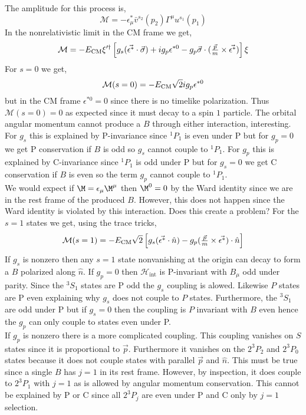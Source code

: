 \documentclass[12pt]{article}
\newcommand{\cM}{\mathcal{M}}
\begin{document}
The amplitude for this process is,
\[ \cM = - \epsilon_\mu^* \bar{v}^{s_2}(p_2) \Gamma^\mu u^{s_1}(p_1) \]
In the nonrelativistic limit in the CM frame we get,
\[ \cM = - E_{\CM} \xi'^{\dagger} \left[ g_s ( \vec{\epsilon^*} \cdot \vec{\sigma}) + i g_p \epsilon^{*0} - g_p \vec{\sigma} \cdot (\tfrac{\vec{p}}{m} \times \vec{\epsilon^*})  \right] \xi \]
For $s = 0$ we get,
\[ \cM(s = 0) = - E_{\CM} \sqrt{2} i g_p \epsilon^{*0} \]
but in the CM frame $\epsilon^{*0} = 0$ since there is no timelike polarization. Thus $\cM(s = 0) = 0$ as expected since it must decay to a spin $1$ particle. The orbital angular momentum cannot produce a $B$ through either interaction, interesting. For $g_s$ this is explained by P-invariance since ${}^1 P_1$ is even under P but for $g_p = 0$ we get P conservation if $B$ is odd so $g_s$ cannot couple to ${}^1 P_1$. For $g_p$ this is explained by C-invariance since ${}^1 P_1$ is odd under P but for $g_s = 0$ we get C conservation if $B$ is even so the term $g_p$ cannot couple to ${}^1 P_1$.
\bigskip\\
We would expect if $\M = \epsilon_\mu \M^\mu$ then $\M^0 = 0$ by the Ward identity since we are in the rest frame of the produced $B$. However, this does not happen since the Ward identity is violated by this interaction. Does this create a problem? For the $s = 1$ states we get, using the trace tricks,
\[ \cM(s = 1) = - E_{\CM} \sqrt{2} \left[ g_s (\vec{\epsilon^*} \cdot \hat{n}) - g_p (\tfrac{\vec{p}}{m} \times \vec{\epsilon^*}) \cdot \hat{n} \right] \]
If $g_s$ is nonzero then any $s = 1$ state nonvanishing at the origin can decay to form a $B$ polarized along $\hat{n}$. If $g_p = 0$ then $\mathcal{H}_{\text{int}}$ is P-invariant with $B_\mu$ odd under parity. Since the ${}^3 S_1$ states are P odd the $g_s$ coupling is alowed. Likewise $P$ states are P even explaining why $g_s$ does not couple to $P$ states. Furthermore, the ${}^3 S_1$ are odd under P but if $g_s = 0$ then the coupling is $P$ invariant with $B$ even hence the $g_p$ can only couple to states even under P.  
\bigskip\\
If $g_p$ is nonzero there is a more complicated coupling. This coupling vanishes on $S$ states since it is proportional to $\vec{p}$. Furthermore it vanishes on the $2^3 P_2$ and $2^3 P_0$ states because it does not couple states with parallel $\vec{p}$ and $\hat{n}$. This must be true since a single $B$ has $j = 1$ in its rest frame. However, by inspection, it does couple to $2^3 P_1$ with $j = 1$ as is allowed by angular momentum conservation. This cannot be explained by P or C since all $2^{3} P_j$ are even under P and C only by $j = 1$ selection. 
\end{document}
